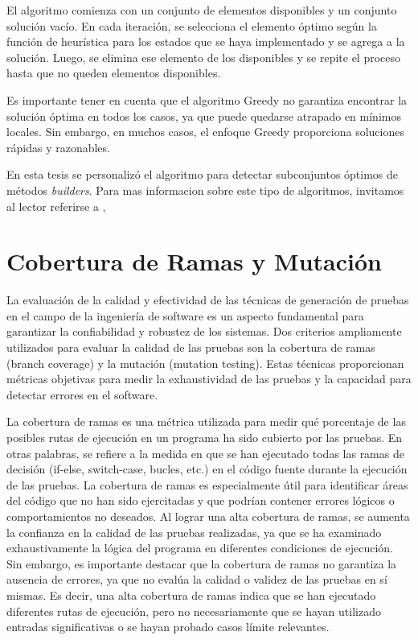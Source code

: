El algoritmo comienza con un conjunto de elementos disponibles y un conjunto solución vacío. En cada iteración, se selecciona el elemento óptimo según la función de heurística para los estados que se haya implementado y se agrega a la solución. Luego, se elimina ese elemento de los disponibles y se repite el proceso hasta que no queden elementos disponibles.

Es importante tener en cuenta que el algoritmo Greedy no garantiza encontrar la solución óptima en todos los casos, ya que puede quedarse atrapado en mínimos locales. Sin embargo, en muchos casos, el enfoque Greedy proporciona soluciones rápidas y razonables.

En esta tesis se personalizó el algoritmo para detectar subconjuntos óptimos de métodos \emph{builders}. 
Para mas informacion sobre este tipo de algoritmos, invitamos al lector referirse a \cite{Cormen2009}, \cite{kleinberg2006}

\section{Cobertura de Ramas y Mutación}

La evaluación de la calidad y efectividad de las técnicas de generación de pruebas en el campo de la ingeniería de software es un aspecto fundamental para garantizar la confiabilidad y robustez de los sistemas. Dos criterios ampliamente utilizados para evaluar la calidad de las pruebas son la cobertura de ramas (branch coverage) y la mutación (mutation testing). Estas técnicas proporcionan métricas objetivas para medir la exhaustividad de las pruebas y la capacidad para detectar errores en el software.

La cobertura de ramas es una métrica utilizada para medir qué porcentaje de las posibles rutas de ejecución en un programa ha sido cubierto por las pruebas. En otras palabras, se refiere a la medida en que se han ejecutado todas las ramas de decisión (if-else, switch-case, bucles, etc.) en el código fuente durante la ejecución de las pruebas. La cobertura de ramas es especialmente útil para identificar áreas del código que no han sido ejercitadas y que podrían contener errores lógicos o comportamientos no deseados.
Al lograr una alta cobertura de ramas, se aumenta la confianza en la calidad de las pruebas realizadas, ya que se ha examinado exhaustivamente la lógica del programa en diferentes condiciones de ejecución. Sin embargo, es importante destacar que la cobertura de ramas no garantiza la ausencia de errores, ya que no evalúa la calidad o validez de las pruebas en sí mismas. Es decir, una alta cobertura de ramas indica que se han ejecutado diferentes rutas de ejecución, pero no necesariamente que se hayan utilizado entradas significativas o se hayan probado casos límite relevantes.

